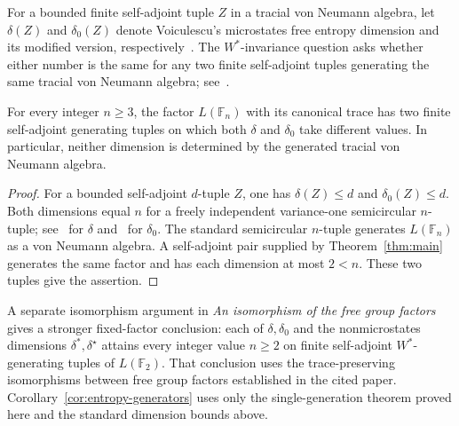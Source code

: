 For a bounded finite self-adjoint tuple $Z$ in a tracial von Neumann
algebra, let $\delta(Z)$ and $\delta_0(Z)$ denote Voiculescu's
microstates free entropy dimension and its modified version,
respectively~\cite[Section~2.4]{Voiculescu2002Entropy}.
The $W^*$-invariance question asks whether either number is the same
for any two finite self-adjoint tuples generating the same tracial
von Neumann algebra; see~\cite[Section~2.6]{Voiculescu2002Entropy}.

\begin{corollary}\label{cor:entropy-generators}
For every integer $n\geq3$, the factor $L(\mathbb F_n)$ with its
canonical trace has two finite self-adjoint generating tuples on
which both $\delta$ and $\delta_0$ take different values. In
particular, neither dimension is determined by the generated
tracial von Neumann algebra.
\end{corollary}

\begin{proof}
For a bounded self-adjoint $d$-tuple $Z$, one has
$\delta(Z)\leq d$ and $\delta_0(Z)\leq d$. Both dimensions equal
$n$ for a freely independent variance-one semicircular $n$-tuple;
see~\cite[Section~2.4(a), (c), and (d)]{Voiculescu2002Entropy}
for $\delta$ and~\cite[Section~5]{BrannanEtAl2023} for $\delta_0$.
The standard semicircular $n$-tuple generates $L(\mathbb F_n)$ as
a von Neumann algebra. A self-adjoint pair supplied by
Theorem~\ref{thm:main} generates the same factor and has each
dimension at most $2<n$. These two tuples give the assertion.
\end{proof}

A separate isomorphism argument in
\emph{An isomorphism of the free group factors}
\cite[Corollary~7.1]{OpenAIFreeGroupFactors2026} gives a stronger
fixed-factor conclusion: each of $\delta,\delta_0$ and the
nonmicrostates dimensions $\delta^*,\delta^\star$ attains every
integer value $n\geq2$ on finite self-adjoint $W^*$-generating tuples
of $L(\mathbb F_2)$. That conclusion uses the trace-preserving
isomorphisms between free group factors established in the cited
paper. Corollary~\ref{cor:entropy-generators} uses only the
single-generation theorem proved here and the standard dimension
bounds above.
